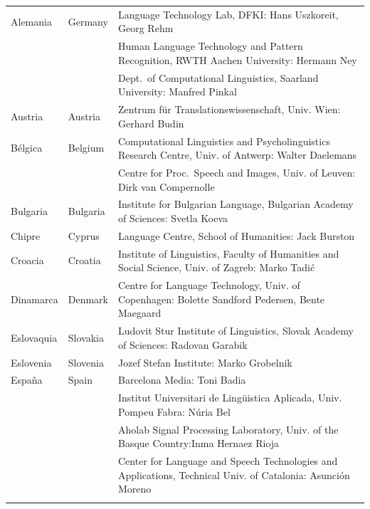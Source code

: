 \small
\begin{longtable}{@{}llp{113mm}@{}}
  Alemania & \textcolor{grey1}{Germany} & Language Technology Lab, DFKI: Hans Uszkoreit, Georg Rehm \\ \addlinespace
  & & Human Language Technology and Pattern Recognition, RWTH Aachen University: Hermann Ney \\ \addlinespace
  & & Dept.~of Computational Linguistics, Saarland University: Manfred Pinkal \\ \addlinespace 
  Austria & \textcolor{grey1}{Austria} & Zentrum für Translationswissenschaft, Univ. Wien: Gerhard Budin \\ \addlinespace 
  Bélgica & \textcolor{grey1}{Belgium} & Computational Linguistics and Psycholinguistics Research Centre, Univ. of Antwerp: Walter Daelemans \\ \addlinespace
  & & Centre for Proc.~Speech and Images, Univ. of Leuven: Dirk van Compernolle \\ \addlinespace
  Bulgaria & \textcolor{grey1}{Bulgaria} & Institute for Bulgarian Language, Bulgarian Academy of Sciences: Svetla Koeva \\ \addlinespace
  Chipre & \textcolor{grey1}{Cyprus} & Language Centre, School of Humanities: Jack Burston \\ \addlinespace
  Croacia & \textcolor{grey1}{Croatia} & Institute of Linguistics, Faculty of Humanities and Social Science, Univ. of Zagreb: Marko Tadić \\ \addlinespace
  Dinamarca &  \textcolor{grey1}{Denmark} & Centre for Language Technology, Univ. of Copenhagen: Bolette Sandford Pedersen, Bente Maegaard \\ \addlinespace
  Eslovaquia & \textcolor{grey1}{Slovakia} & Ludovit Stur Institute of Linguistics, Slovak Academy of Sciences: Radovan Garabik \\ \addlinespace 
  Eslovenia & \textcolor{grey1}{Slovenia} & Jozef Stefan Institute: Marko Grobelnik \\ \addlinespace 
  España & \textcolor{grey1}{Spain} & Barcelona Media: Toni Badia \\ \addlinespace 
  & & Institut Universitari de Lingüistica Aplicada, Univ. Pompeu Fabra: Núria Bel \\ \addlinespace 
  & & Aholab Signal Processing Laboratory, Univ. of the Basque Country:\newline Inma Hernaez Rioja \\ \addlinespace 
  & & Center for Language and Speech Technologies and Applications, Technical Univ. of Catalonia: Asunción Moreno \\ \addlinespace 

\end{longtable}
